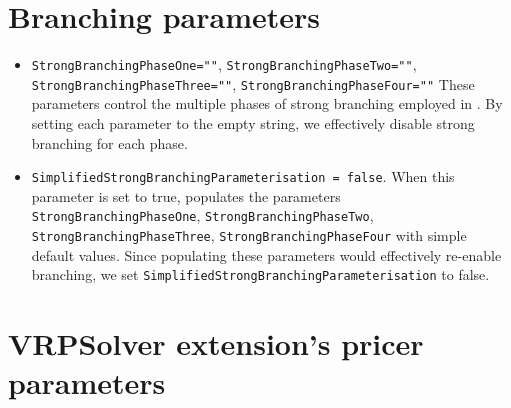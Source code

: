 \section{Branching parameters}

\begin{itemize}
	\item \texttt{StrongBranchingPhaseOne=""}, \texttt{StrongBranchingPhaseTwo=""}, \texttt{StrongBranchingPhaseThree=""}, \texttt{StrongBranchingPhaseFour=""}
	      These parameters control the multiple phases of strong branching employed in \bapcod.
	      By setting each parameter to the empty string, we effectively disable strong branching for each phase.
	\item \texttt{SimplifiedStrongBranchingParameterisation = false}.
	      When this parameter is set to true, \bapcod populates the parameters \texttt{StrongBranchingPhaseOne}, \texttt{StrongBranchingPhaseTwo}, \texttt{StrongBranchingPhaseThree}, \texttt{StrongBranchingPhaseFour}
	      with simple default values.
	      Since populating these parameters would effectively re-enable branching, we set \texttt{SimplifiedStrongBranchingParameterisation} to false.
\end{itemize}

\section{VRPSolver extension's pricer parameters}

